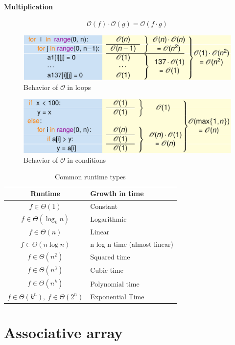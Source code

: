 \documentclass[12pt, a4paper]{scrartcl}
\newcommand{\bigO}{\mathcal{O}}
\begin{document}
\paragraph{Multiplication}
  \begin{equation}
    \bigO(f)\cdot\bigO(g)=\bigO(f\cdot g)
  \end{equation}
\begin{figure}[!htbp]
  \centering
  \includegraphics[width=.8\textwidth]{bigO_loops}
  \caption{Behavior of $\bigO$ in loops}
  \label{fig:bigO_loops}
\end{figure}
\begin{figure}[!htbp]
  \centering
  \includegraphics[width=.8\textwidth]{bigO_conditions}
  \caption{Behavior of $\bigO$ in conditions}
  \label{fig:bigO_conditions}
\end{figure}
\begin{table}[!htbp]
  \centering
  \caption{Common runtime types}
  \label{tab:common_runtime}
  \begin{tabular}{c|l}
    Runtime&Growth in time\\\hline\hline
    $f\in\Theta(1)$&Constant\\
    $f\in\Theta(\log_k n)$&Logarithmic\\
    $f\in\Theta(n)$&Linear\\
    $f\in\Theta(n\log n)$&n-log-n time (almost linear)\\\hline
    $f\in\Theta(n^2)$&Squared time\\
    $f\in\Theta(n^3)$&Cubic time\\
    $f\in\Theta(n^k)$&Polynomial time\\\hline
    $f\in\Theta(k^n),\ f\in\Theta(2^n)$&Exponential Time\\
  \end{tabular}
\end{table}

\newpage{}
\section{Associative array}
\label{sec:associative_array}
\end{document}
